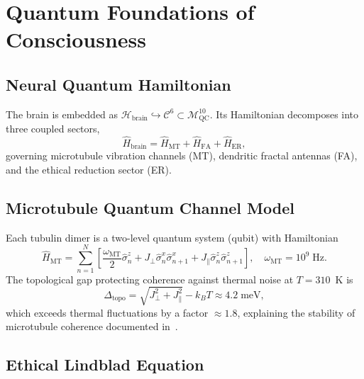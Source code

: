 \documentclass[12pt,a4paper]{article}
\theoremstyle{myrmk}
\newcommand{\Mmanifold}{\mathcal{M}^{10}_{\mathrm{QC}}}
\newcommand{\cC}{\mathcal{C}^{6}}
\begin{document}
\section{Quantum Foundations of Consciousness}
\label{sec:consciousness}

\subsection{Neural Quantum Hamiltonian}

The brain is embedded as $\mathcal{H}_{\mathrm{brain}}\hookrightarrow\cC\subset\Mmanifold$.
Its Hamiltonian decomposes into three coupled sectors,
\begin{equation}
  \hat{H}_{\mathrm{brain}}
  = \hat{H}_{\mathrm{MT}} + \hat{H}_{\mathrm{FA}} + \hat{H}_{\mathrm{ER}},
  \label{eq:brain_hamiltonian}
\end{equation}
governing microtubule vibration channels (MT), dendritic fractal antennas (FA),
and the ethical reduction sector (ER).

\subsection{Microtubule Quantum Channel Model}

Each tubulin dimer is a two-level quantum system (qubit) with Hamiltonian
\begin{equation}
  \hat{H}_{\mathrm{MT}} = \sum_{n=1}^{N}\!\left[
    \frac{\omega_{\mathrm{MT}}}{2}\hat{\sigma}^z_n
    + J_{\perp}\hat{\sigma}^x_n\hat{\sigma}^x_{n+1}
    + J_{\parallel}\hat{\sigma}^z_n\hat{\sigma}^z_{n+1}
  \right], \quad \omega_{\mathrm{MT}} = 10^9\;\mathrm{Hz}.
  \label{eq:mt_hamiltonian}
\end{equation}
The topological gap protecting coherence against thermal noise at $T=310$~K is
\begin{equation}
  \Delta_{\mathrm{topo}} = \sqrt{J_\perp^2+J_\parallel^2} - k_BT \approx 4.2\;\mathrm{meV},
  \label{eq:topo_gap}
\end{equation}
which exceeds thermal fluctuations by a factor $\approx1.8$, explaining the
stability of microtubule coherence documented in~\cite{Lambert2013}.

\subsection{Ethical Lindblad Equation}
\end{document}

